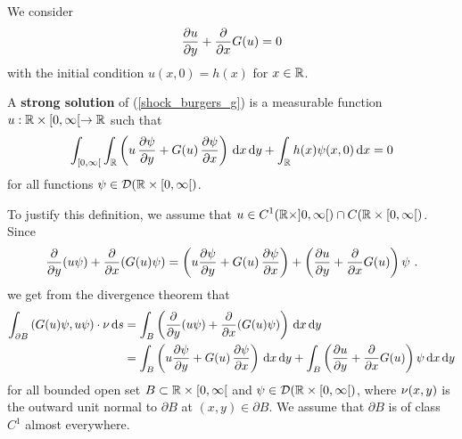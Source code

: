 We consider
\begin{equation}\label{shock_burgers_g}
\pdydx{u}{y} + \pdfdx{G(u)}{x} = 0
\end{equation}
with the initial condition $u(x,0) = h(x)$ for $x \in \RR$.

\begin{defn}
A {\bfseries strong solution}
of (\ref{shock_burgers_g}) is a measurable function $u:\RR\times [0,\infty[
\rightarrow \RR$ such that
\begin{equation} \label{shock_strong}
\int_{[0,\infty[} \int_{\RR}
\left(u\,\pdydx{\psi}{y} + G(u)\,\pdydx{\psi}{x} \right) \dx{x}\dx{y}
+ \int_{\RR} h(x) \psi(x,0) \dx{x} = 0
\end{equation}
for all functions $\psi \in \DD(\RR \times [0,\infty[)$.
\end{defn}

To justify this definition, we assume that
$\displaystyle u \in C^1(\RR \times ]0,\infty[) \cap C(\RR \times [0,\infty[)$.
Since
\[
\pdfdx{(u\psi)}{y} + \pdfdx{( G(u) \psi)}{x}
= \left( u \pdydx{\psi}{y} + G(u)\,\pdydx{\psi}{x} \right) +
\left( \pdydx{u}{y} + \pdfdx{G(u)}{x}\right) \psi \ .
\]
we get from the divergence theorem that
\begin{equation} \label{shock_strong_cons}
\begin{split}
\int_{\partial B} \left( G(u) \psi, u \psi\right)\cdot \VEC{\nu} \dx{s}
&=\int_B \left( \pdfdx{(u\psi)}{y} + \pdfdx{( G(u) \psi)}{x} \right)
\dx{x}\dx{y} \\
&= \int_B \left( u \pdydx{\psi}{y} + G(u)\,\pdydx{\psi}{x}
\right) \dx{x}\dx{y}
+ \int_B \left( \pdydx{u}{y} + \pdfdx{G(u)}{x}\right) \psi \dx{x}\dx{y}
\end{split}
\end{equation}
for all bounded open set $B \subset \RR\times [0,\infty[$
and $\psi \in \DD(\RR\times [0,\infty[)$,
where $\displaystyle \VEC{\nu}(x,y)$ is the outward unit normal to
$\partial B$ at $(x,y) \in \partial B$.  We assume that $\partial B$
is of class $C^1$ almost everywhere.

